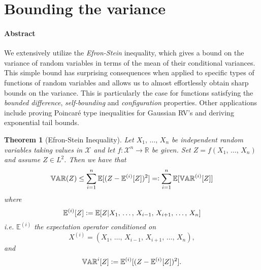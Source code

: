 \documentclass{amsproc}
\newtheorem{theorem}{Theorem}
\newcommand{\defeq}{\vcentcolon=} %
\newcommand{\eqdef}{=\vcentcolon} %
\newcommand{\R}{\mathbb{R}}
\newcommand{\E}{\mathbb{E}} %
\newcommand{\var}{\mathbb{VAR}} %
\begin{document}

\section{Bounding the variance}
\label{sec:bound_var}
\paragraph{\textbf{Abstract}}
We extensively utilize the \textit{Efron-Stein} inequality, which gives a bound on the variance of random variables in terms of the mean of their conditional variances. This simple bound has surprising consequences when applied to specific types of functions of random variables and allows us to almost effortlessly obtain sharp bounds on the variance. This is particularly the case for functions satisfying the \textit{bounded difference}, \emph{self-bounding} and \emph{configuration} properties. Other applications include proving Poincar\'{e} type inequalities for Gaussian RV's and deriving exponential tail bounds.

\begin{theorem}[Efron-Stein Inequality]
\label{thm:ESI}
	Let $X_1,\,\dots,\,X_n$ be independent random variables taking values in $\mathcal{X}$ and let $f: \mathcal{X}^n \to \R$ be given.
	Set $Z = f(X_1,\,\dots,\,X_n)$ and assume $Z \in L^2$. Then we have that 
	$$\var(Z)\leq \sum\limits_{i=1}^n \E[(Z-\E^{(i)}[Z])^2] \eqdef \sum\limits_{i=1}^n \E[\var^{(i)}[Z]]$$ where 
	$$\E^{(i)}[Z] \defeq \E[Z|X_1,\,\dots,\,X_{i-1},\,X_{i+1},\,\dots,\,X_n]$$
	i.e. $\E^{(i)}$ the expectation operator conditioned on $$X^{(i)} = (X_1,\,\dots,\,X_{i-1},\,X_{i+1},\,\dots,\,X_n),$$
	and $$\var^{i}[Z] \defeq \E^{(i)}[(Z - \E^{(i)}[Z])^2].$$
\end{theorem}
\end{document}
